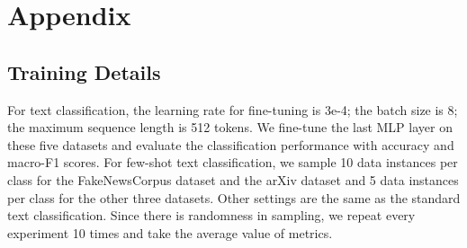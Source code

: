 \documentclass[11pt]{article}
\newcommand{\our}{\mbox{\textsc{DocSplit}}}
\begin{document}





\clearpage
\appendix
\section{Appendix}

\subsection{Training Details}
\label{app:details}
For text classification, the learning rate for fine-tuning is 3e-4; the batch size is 8; the maximum sequence length is 512 tokens. 
We fine-tune the last MLP layer on these five datasets and evaluate the classification performance with accuracy and macro-F1 scores.
For few-shot text classification, we sample 10 data instances per class for the FakeNewsCorpus dataset and the arXiv dataset and 5 data instances per class for the other three datasets. 
Other settings are the same as the standard text classification. 
Since there is randomness in sampling, we repeat every experiment 10 times and take the average value of metrics.

\end{document}

